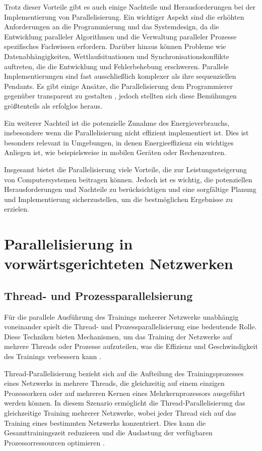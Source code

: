 Trotz dieser Vorteile gibt es auch einige Nachteile und Herausforderungen bei der Implementierung von Parallelisierung. Ein wichtiger Aspekt sind die erhöhten Anforderungen an die Programmierung und das Systemdesign, da die Entwicklung paralleler Algorithmen und die Verwaltung paralleler Prozesse spezifisches Fachwissen erfordern. Darüber hinaus können Probleme wie Datenabhängigkeiten, Wettlaufsituationen und Synchronisationskonflikte auftreten, die die Entwicklung und Fehlerbehebung erschweren. Parallele Implementierungen sind fast ausschließlich komplexer als ihre sequenziellen Pendants. Es gibt einige Ansätze, die Parallelisierung dem Programmierer gegenüber transparent zu gestalten \citep{Sidorenko_Subway_Train_Scheduling}, jedoch stellten sich diese Bemühungen größtenteils als erfolglos heraus.

Ein weiterer Nachteil ist die potenzielle Zunahme des Energieverbrauchs, insbesondere wenn die Parallelisierung nicht effizient implementiert ist. Dies ist besonders relevant in Umgebungen, in denen Energieeffizienz ein wichtiges Anliegen ist, wie beispielsweise in mobilen Geräten oder Rechenzentren.

Insgesamt bietet die Parallelisierung viele Vorteile, die zur Leistungssteigerung von Computersystemen beitragen können. Jedoch ist es wichtig, die potenziellen Herausforderungen und Nachteile zu berücksichtigen und eine sorgfältige Planung und Implementierung sicherzustellen, um die bestmöglichen Ergebnisse zu erzielen.

\section{Parallelisierung in vorwärtsgerichteten Netzwerken}
\label{sec:Grundlagen_Parallelisierung_Neuronale_Netze}
\subsection{Thread- und Prozessparallelsierung}
\label{sec:Grundlagen_Thread_Parallelisierung}
Für die parallele Ausführung des Trainings mehrerer Netzwerke unabhängig voneinander spielt die Thread- und Prozessparallelisierung eine bedeutende Rolle. Diese Techniken bieten Mechanismen, um das Training der Netzwerke auf mehrere Threads oder Prozesse aufzuteilen, was die Effizienz und Geschwindigkeit des Trainings verbessern kann \citep{Flynn_Computer_Organizations_and_their_Effectiveness}.

Thread-Parallelisierung bezieht sich auf die Aufteilung des Trainingsprozesses eines Netzwerks in mehrere Threads, die gleichzeitig auf einem einzigen Prozessorkern oder auf mehreren Kernen eines Mehrkernprozessors ausgeführt werden können. In diesem Szenario ermöglicht die Thread-Parallelisierung das gleichzeitige Training mehrerer Netzwerke, wobei jeder Thread sich auf das Training eines bestimmten Netzwerks konzentriert. Dies kann die Gesamttrainingszeit reduzieren und die Auslastung der verfügbaren Prozessorressourcen optimieren \citep{Flynn_Computer_Organizations_and_their_Effectiveness}.

